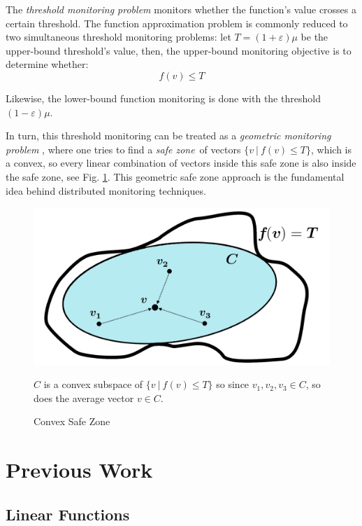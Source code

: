 \documentclass[11pt, conference]{article}
\newcommand{\safeZone}{\textit{safe zone}}
\begin{document}
The \textit{threshold monitoring problem} \cite{garofalakis2013sketch}  monitors whether the function's value crosses a certain threshold. The function approximation problem is commonly reduced to two simultaneous threshold monitoring problems: let ${T = (1+\varepsilon )\mu}$ be the upper-bound threshold's value, then, the upper-bound monitoring objective is to determine whether:
\begin{equation}
f(v) \leq T
\end{equation}

Likewise, the lower-bound function monitoring is done with the threshold ${(1-\varepsilon )\mu}$.

In turn, this threshold monitoring can be treated as a \textit{geometric monitoring problem} \cite{sharfman2007geometric}, where one tries to find a \safeZone \ of vectors ${\{v \ | \ f(v) \leq T\}}$, which is a convex, so every linear combination of vectors inside this safe zone is also inside the safe zone, see Fig. \ref{fig:ConvexSafeZoneSketch}. This geometric safe zone approach is the fundamental idea behind distributed monitoring techniques.

\begin{figure}[h]
\begin{center}
\includegraphics[width=0.7\linewidth]{Pics/PNGs/ConvexSafeZone.png}
\end{center}
\caption{Convex Safe Zone}
\label{fig:ConvexSafeZoneSketch}
\medskip
\small
\begin{center}
$C$ is a convex subspace of ${\{v \ | \ f(v) \leq T\}}$ so since ${v_1,v_2,v_3 \in C}$, so does the average vector $v \in C$.
\end{center}
\end{figure}

\section{Previous Work}

\subsection{Linear Functions}
\end{document}
